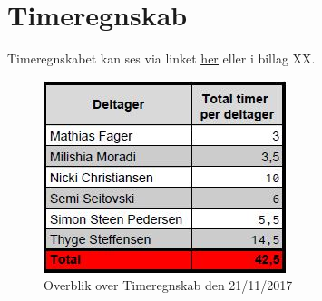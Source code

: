 \section*{Timeregnskab}
Timeregnskabet kan ses via linket 
    \color{blue}
    \underline{\href{https://goo.gl/Rsx9wG}{her}}
    \color{black}
 eller i billag XX.
    \begin{figure}[h]
        \begin{center}
            \includegraphics{fig/TROver.jpg}
            \caption{Overblik over Timeregnskab den 21/11/2017}
        \end{center}
    \end{figure}
\pagebreak
\tableofcontents
